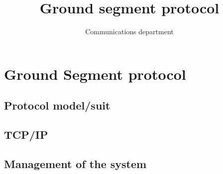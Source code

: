 \documentclass[12pt,a4paper]{report}
\title{Ground segment protocol}
\author{Communications department}
\begin{document}
\maketitle
\tableofcontents

\newpage
\chapter{Ground Segment protocol}
\section{Protocol model/suit}


\newpage
\section{TCP/IP}


\newpage
\section{Management of the system}




\end{document}
